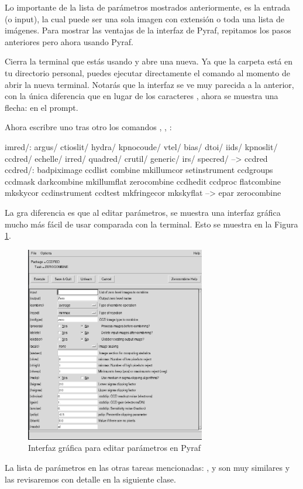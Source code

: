Lo importante de la lista de parámetros mostrados anteriormente, es la entrada (o input), la cual puede ser una sola imagen con extensión  o toda una lista de imágenes. Para mostrar las ventajas de la interfaz de Pyraf, repitamos los pasos anteriores pero ahora usando Pyraf. 

Cierra la terminal que estás usando y abre una nueva. Ya que la carpeta  está en tu directorio personal, puedes ejecutar directamente el comando  al momento de abrir la nueva terminal. Notarás que la interfaz se ve muy parecida a la anterior, con la única diferencia que en lugar de los caracteres , ahora se muestra una flecha: \norbash{-->} en el prompt. 

Ahora escribre uno tras otro los comandos , , :

\begin{bash}
imred/:
 argus/         ctioslit/       hydra/          kpnocoude/      vtel/
 bias/          dtoi/           iids/           kpnoslit/
 ccdred/        echelle/        irred/          quadred/
 crutil/        generic/        irs/            specred/
--> ccdred
ccdred/:
 badpiximage    ccdlist         combine         mkillumcor      setinstrument
 ccdgroups      ccdmask         darkcombine     mkillumflat     zerocombine
 ccdhedit       ccdproc         flatcombine     mkskycor
 ccdinstrument  ccdtest         mkfringecor     mkskyflat
--> epar zerocombine
\end{bash}

La gra diferencia es que al editar parámetros, se muestra una interfaz gráfica mucho más fácil de usar comparada con la terminal. Esto se muestra en la Figura \ref{fig:pyraf-epar-example}.

\begin{figure}[htb]
  \centering
	\includegraphics[width=0.7\textwidth]{figures/pyraf-epar-example.png}
	\caption{Interfaz gráfica para editar parámetros en Pyraf}
	\label{fig:pyraf-epar-example} 
\end{figure}


La lista de parámetros en las otras tareas mencionadas: ,  y  son muy similares y las revisaremos con detalle en la siguiente clase. 
